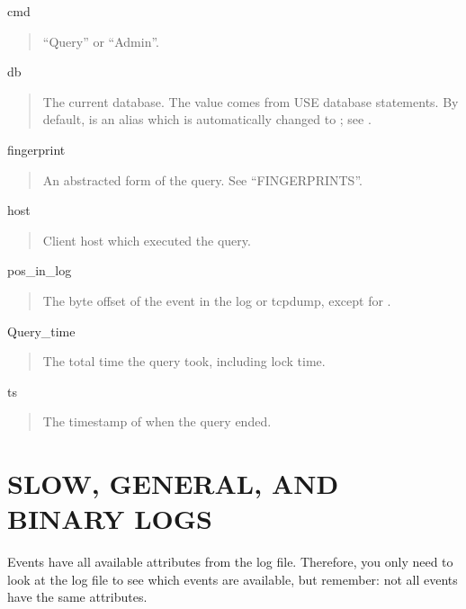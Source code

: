\documentclass[letterpaper,10pt,english]{sphinxmanual}
\begin{document}
cmd
\begin{quote}

“Query” or “Admin”.
\end{quote}

db
\begin{quote}

The current database.  The value comes from USE database statements.
By default,  is an alias which is automatically
changed to ; see {\hyperref[\detokenize{mariadb-query-digest:cmdoption-mariadb-query-digest-attribute-aliases}]{}}.
\end{quote}

fingerprint
\begin{quote}

An abstracted form of the query.  See “FINGERPRINTS”.
\end{quote}

host
\begin{quote}

Client host which executed the query.
\end{quote}

pos\_in\_log
\begin{quote}

The byte offset of the event in the log or tcpdump,
except for {\hyperref[\detokenize{mariadb-query-digest:cmdoption-mariadb-query-digest-processlist}]{}}.
\end{quote}

Query\_time
\begin{quote}

The total time the query took, including lock time.
\end{quote}

ts
\begin{quote}

The timestamp of when the query ended.
\end{quote}


\section{SLOW, GENERAL, AND BINARY LOGS}
\label{\detokenize{mariadb-query-digest:slow-general-and-binary-logs}}
Events have all available attributes from the log file.  Therefore, you only
need to look at the log file to see which events are available, but remember:
not all events have the same attributes.
\end{document}
